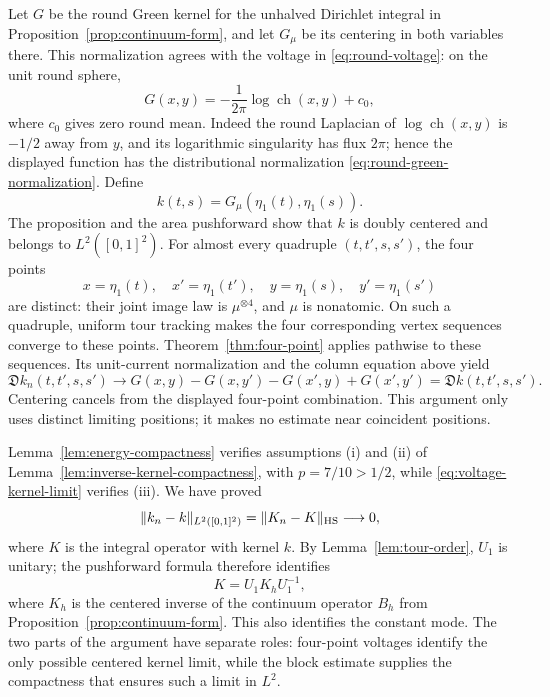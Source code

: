 Let \(G\) be the round Green kernel for the unhalved Dirichlet integral in
Proposition~\ref{prop:continuum-form}, and let \(G_\mu\) be its centering in
both variables there.  This normalization agrees with the voltage in
\eqref{eq:round-voltage}: on the unit round sphere,
\[
 G(x,y)=-\frac1{2\pi}\log\operatorname{ch}(x,y)+c_0,
\]
where \(c_0\) gives zero round mean.  Indeed the round Laplacian of
\(\log\operatorname{ch}(x,y)\) is \(-1/2\) away from \(y\), and its
logarithmic singularity has flux \(2\pi\); hence the displayed function
has the distributional normalization \eqref{eq:round-green-normalization}.
Define
\[
 k(t,s)=G_\mu(\eta_1(t),\eta_1(s)).
\]
The proposition and the area pushforward show that \(k\) is doubly centered
and belongs to \(L^2([0,1]^2)\).  For almost every quadruple
\((t,t',s,s')\), the four points
\[
 x=\eta_1(t),\quad x'=\eta_1(t'),\quad y=\eta_1(s),\quad y'=\eta_1(s')
\]
are distinct: their joint image law is \(\mu^{\otimes4}\), and \(\mu\) is
nonatomic.  On such a quadruple, uniform tour tracking makes the four
corresponding vertex sequences converge to these points.
Theorem~\ref{thm:four-point} applies pathwise to these sequences.  Its
unit-current normalization and the column equation above yield
\begin{equation}\label{eq:voltage-kernel-limit}
 \mathfrak Dk_n(t,t',s,s')\longrightarrow
 G(x,y)-G(x,y')-G(x',y)+G(x',y')
 =\mathfrak Dk(t,t',s,s').
\end{equation}
Centering cancels from the displayed four-point combination.  This
argument only uses distinct limiting positions; it makes no estimate near
coincident positions.

Lemma~\ref{lem:energy-compactness} verifies assumptions (i) and (ii) of
Lemma~\ref{lem:inverse-kernel-compactness}, with \(p=7/10>1/2\), while
\eqref{eq:voltage-kernel-limit} verifies (iii).  We have proved
\begin{equation}\label{eq:inverse-HS-convergence}
 \lVert k_n-k\rVert_{L^2([0,1]^2)}
 =\lVert K_n-K\rVert_{\mathrm{HS}}\longrightarrow0,
\end{equation}
where \(K\) is the integral operator with kernel \(k\).  By
Lemma~\ref{lem:tour-order}, \(U_1\) is unitary; the pushforward formula
therefore identifies
\[
 K=U_1K_hU_1^{-1},
\]
where \(K_h\) is the centered inverse of the continuum operator \(B_h\)
from Proposition~\ref{prop:continuum-form}.  This also identifies the
constant mode.  The two parts of the argument have separate roles:
four-point voltages identify the only possible centered kernel limit, while
the block estimate supplies the compactness that ensures such a limit in
\(L^2\).

